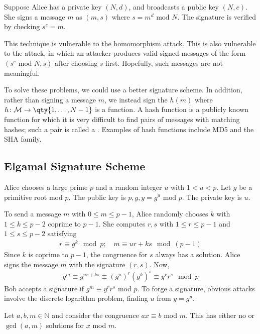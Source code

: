 \begin{example}
    Suppose Alice has a private key $(N, d)$, and broadcasts a public key $(N, e)$.
    She signs a message $m$ as $(m, s)$ where $s = m^d \text{ mod } N$.
    The signature is verified by checking $s^e = m$.

    This technique is vulnerable to the homomorphism attack.
    This is also vulnerable to the  attack, in which an attacker produces valid signed messages of the form $(s^e \text{ mod } N, s)$ after choosing $s$ first.
    Hopefully, such messages are not meaningful.

    To solve these problems, we could use a better signature scheme.
    In addition, rather than signing a message $m$, we instead sign the  $h(m)$ where $h \colon \mathcal M \to \qty{1, \dots, N-1}$ is a  function.
    A hash function is a publicly known function for which it is very difficult to find pairs of messages with matching hashes; such a pair is called a .
    Examples of hash functions include MD5 and the SHA family.
\end{example}

\subsection{Elgamal Signature Scheme}
Alice chooses a large prime $p$ and a random integer $u$ with $1 < u < p$.
Let $g$ be a primitive root mod $p$.
The public key is $p, g, y = g^u \text{ mod } p$.
The private key is $u$.

To send a message $m$ with $0 \leq m \leq p-1$, Alice randomly chooses $k$ with $1 \leq k \leq p-2$ coprime to $p-1$.
She computes $r, s$ with $1 \leq r \leq p-1$ and $1 \leq s \leq p-2$ satisfying
\begin{align*}
    r \equiv g^k \mod p;\quad m \equiv ur + ks \mod (p-1)
\end{align*}
Since $k$ is coprime to $p-1$, the congruence for $s$ always has a solution.
Alice signs the message $m$ with the signature $(r, s)$.
Now,
\begin{align*}
    g^{m} \equiv g^{ur + ks} \equiv (g^u)^r (g^k)^s \equiv y^r r^s \mod p
\end{align*}
Bob accepts a signature if $g^{m} \equiv y^r r^s$ mod $p$.
To forge a signature, obvious attacks involve the discrete logarithm problem, finding $u$ from $y = g^u$.

\begin{lemma}
    Let $a, b, m \in \mathbb N$ and consider the congruence $ax \equiv b$ mod $m$.
    This has either no or $\gcd(a,m)$ solutions for $x$ mod $m$.
\end{lemma}

